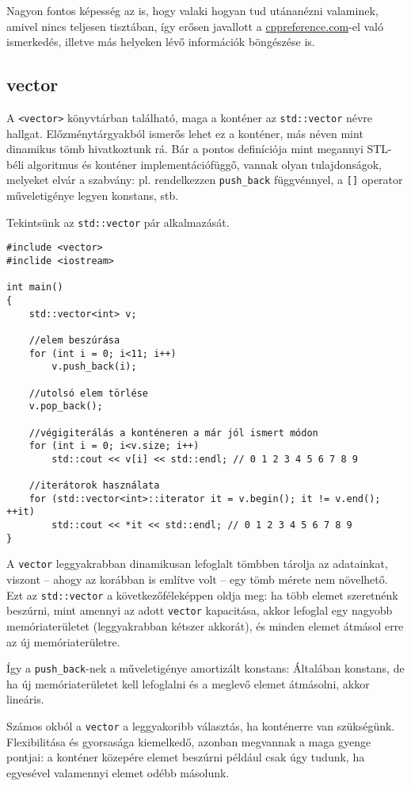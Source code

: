 \documentclass[a4paper,11.5pt,table]{article}
\begin{document}
	\begin{note}
		Nagyon fontos képesség az is, hogy valaki hogyan tud utánanézni valaminek, amivel nincs teljesen tisztában, így erősen javallott a \url{cppreference.com}-el való ismerkedés, illetve más helyeken lévő információk böngészése is.
	\end{note}	
	\subsection{vector}
	A \texttt{<vector>} könyvtárban található, maga a konténer az \texttt{std::vector} névre hallgat. Előzménytárgyakból ismerős lehet ez a konténer, más néven mint dinamikus tömb hivatkoztunk rá. Bár a pontos definíciója mint megannyi STL-béli algoritmus és konténer implementációfüggő, vannak olyan tulajdonságok, melyeket elvár a szabvány: pl. rendelkezzen \texttt{push\_back} függvénnyel, a \texttt{[]} operator műveletigénye legyen konstans, stb.
	
	\medskip
	Tekintsünk az \texttt{std::vector} pár alkalmazását.
	\begin{lstlisting}
#include <vector>
#inclide <iostream>

int main()
{
	std::vector<int> v;
	
	//elem beszúrása
	for (int i = 0; i<11; i++)
		v.push_back(i);
		
	//utolsó elem törlése
	v.pop_back();
	
	//végigiterálás a konténeren a már jól ismert módon
	for (int i = 0; i<v.size; i++)
		std::cout << v[i] << std::endl; // 0 1 2 3 4 5 6 7 8 9
		
	//iterátorok használata
	for (std::vector<int>::iterator it = v.begin(); it != v.end(); ++it)
		std::cout << *it << std::endl; // 0 1 2 3 4 5 6 7 8 9
}
	\end{lstlisting}
	A \texttt{vector} leggyakrabban dinamikusan lefoglalt tömbben tárolja az adatainkat, viszont -- ahogy az korábban is említve volt -- egy tömb mérete nem növelhető. Ezt az \texttt{std::vector} a következőféleképpen oldja meg: ha több elemet szeretnénk beszúrni, mint amennyi az adott \texttt{vector} kapacitása, akkor lefoglal egy nagyobb memóriaterületet (leggyakrabban kétszer akkorát), és minden elemet átmásol erre az új memóriaterületre. 
	
	Így a \texttt{push\_back}-nek a műveletigénye amortizált konstans: Általában konstans, de ha új memóriaterületet kell lefoglalni és a meglevő elemet átmásolni, akkor lineáris.
	
	\begin{note}
		Számos okból a \texttt{vector} a leggyakoribb választás, ha konténerre van szükségünk. Flexibilitása és gyorsasága kiemelkedő, azonban megvannak a maga gyenge pontjai: a konténer közepére elemet beszúrni például csak úgy tudunk, ha egyesével valamennyi elemet odébb másolunk.
	\end{note}
	
\end{document}
